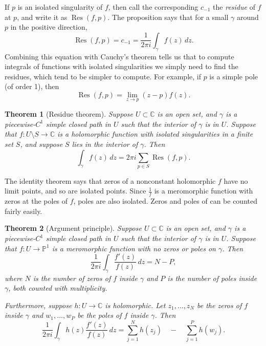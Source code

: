 \documentclass[12pt,openany]{book}
\newcommand{\C}{{\mathbb{C}}}
\newcommand{\bP}{{\mathbb{P}}}
\newcommand{\myindex}[1]{#1\index{#1}}
\theoremstyle{plain}
\newtheorem{thm}{Theorem}[section]
\theoremstyle{remark}
\theoremstyle{definition}
\theoremstyle{exercise}
\theoremstyle{example}
\begin{document}
If $p$ is an isolated singularity of $f$, then call the corresponding
$c_{-1}$ the \emph{\myindex{residue}} of $f$ at $p$, and write it
as $\operatorname{Res}(f,p)$.  
The proposition says that for a small $\gamma$ around $p$ in the positive direction,
\begin{equation*}
\operatorname{Res}(f,p) = c_{-1} = \frac{1}{2\pi i} \int_\gamma f(z) \, dz
.
\end{equation*}
Combining this equation with Cauchy's theorem tells us that to compute
integrals of functions with isolated singularities we simply need to find
the residues,
which tend to be simpler to
compute.  For example, if $p$ is a simple pole (of order 1), then 
\begin{equation*}
\operatorname{Res}(f,p) = \lim_{z \to p} (z-p)f(z) .
\end{equation*}

\begin{thm}[Residue theorem]\label{thm:residue}
Suppose $U \subset \C$ is an open set, and $\gamma$ is a piecewise-$C^1$
simple closed path in $U$ such that the interior of $\gamma$ is in $U$.
Suppose that $f \colon U \setminus S \to \C$ is a holomorphic function with isolated
singularities in a finite set $S$, and suppose $S$ lies in the interior of $\gamma$.
Then
\begin{equation*}
\int_{\gamma} f(z) \, dz = 2\pi i \sum_{p \in S} \operatorname{Res}(f,p) .
\end{equation*}
\end{thm}

The identity theorem says that zeros of a nonconstant holomorphic $f$
have no limit points, and so are isolated points.
Since $\frac{1}{f}$ is a meromorphic
function with zeros at the poles of $f$, poles are also
isolated.  Zeros and poles of  can be counted fairly easily.

\begin{thm}[Argument principle]\label{thm:onevarargprinc}
Suppose $U \subset \C$ is an open set, and $\gamma$ is a piecewise-$C^1$
simple closed path in $U$ such that the interior of $\gamma$ is in $U$.
Suppose that $f \colon U \to \bP^1$ is a meromorphic function with no zeros
or poles on $\gamma$.
Then
\begin{equation*}
\frac{1}{2\pi i}
\int_\gamma \frac{f'(z)}{f(z)} \, dz
= N - P ,
\end{equation*}
where $N$ is the number of zeros of $f$ inside $\gamma$ and $P$ is the
number of poles inside $\gamma$, both counted with multiplicity.

Furthermore, suppose $h \colon U \to \C$ is holomorphic.  
Let $z_1,\ldots,z_N$ be the zeros of $f$ inside $\gamma$ and
$w_1,\ldots,w_P$ be the poles of $f$ inside $\gamma$.
Then
\begin{equation*}
\frac{1}{2\pi i}
\int_\gamma h(z) \frac{f'(z)}{f(z)} \, dz
=
\sum_{j=1}^N h(z_j)
\quad
-
\quad
\sum_{j=1}^P h(w_j) .
\end{equation*}
\end{thm}
\end{document}
